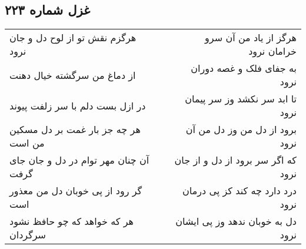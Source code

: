 \begin{center}
\section*{غزل شماره ۲۲۳}
\label{sec:sh223}
\begin{longtable}{l p{0.5cm} r}
هرگزم نقش تو از لوح دل و جان نرود
&&
هرگز از یاد من آن سرو خرامان نرود
\\
از دماغ من سرگشته خیال دهنت
&&
به جفای فلک و غصه دوران نرود
\\
در ازل بست دلم با سر زلفت پیوند
&&
تا ابد سر نکشد وز سر پیمان نرود
\\
هر چه جز بار غمت بر دل مسکین من است
&&
برود از دل من وز دل من آن نرود
\\
آن چنان مهر توام در دل و جان جای گرفت
&&
که اگر سر برود از دل و از جان نرود
\\
گر رود از پی خوبان دل من معذور است
&&
درد دارد چه کند کز پی درمان نرود
\\
هر که خواهد که چو حافظ نشود سرگردان
&&
دل به خوبان ندهد وز پی ایشان نرود
\\
\end{longtable}
\end{center}
